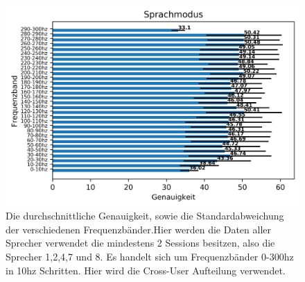  \begin{figure}[H]
  \includegraphics[width=\linewidth]{hqFreBandResultsUser.png}
  \caption{Die durchschnittliche Genauigkeit, sowie die Standardabweichung der verschiedenen Frequenzbänder.Hier werden die Daten aller Sprecher verwendet die mindestens 2 Sessions besitzen, also die Sprecher 1,2,4,7 und 8. Es handelt sich um Frequenzbänder 0-300hz in 10hz Schritten. Hier wird die Cross-User Aufteilung verwendet.}
  \label{fig:mode6}
  \end{figure}